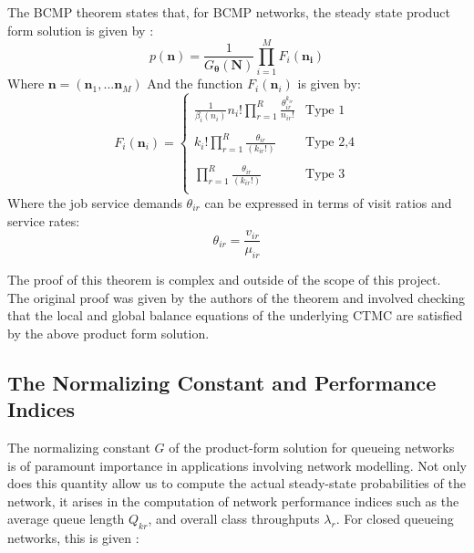 \begin{theorem}
    The BCMP theorem states that, for BCMP networks, the steady state product form solution is given by :
    \begin{equation} \label{eq:BCMP_PFQN}
        p(\mathbf{n}) = \frac{1}{G_{\boldsymbol{\theta}}(\mathbf{N})} \prod _ {i=1} ^ M F_i(\mathbf{n_i})
    \end{equation}
    Where \(\mathbf{n} = (\mathbf{n}_1, ... \mathbf{n}_M)\) And the function \(F_i(\mathbf{n}_i)\) is given by:
    \begin{equation}
        F_i(\mathbf{n}_i)=
        \begin{cases}
            \frac{1}{\beta_i(n_i)} n_i! \prod _{r=1} ^ R  \frac{\theta_{ir}^{k_{ir}}}{n_{ir}!} & \text{Type 1}\\\\
            k_i! \prod _{r=1} ^ R  \frac{\theta_{ir}}{(k_{ir}!)} & \text{Type 2,4}\\\\
            \prod _{r=1} ^ R \frac{\theta_{ir}}{(k_{ir}!)} & \text{Type 3}\\
        \end{cases}
    \end{equation}
    Where the job service demands \(\theta_{ir}\) can be expressed in terms of visit ratios and service rates:
    \begin{equation*}
        \theta_{ir} = \frac{v_{ir}}{\mu_{ir}}
    \end{equation*}
\end{theorem}

The proof of this theorem is complex and outside of the scope of this project. The original proof \cite{Baskett1975OpenCustomers} was given by the authors of the theorem and involved checking that the local and global balance equations of the underlying CTMC are satisfied by the above product form solution.

\subsection{The Normalizing Constant and Performance Indices}
The normalizing constant \(G\) of the product-form solution for queueing networks is of paramount importance in applications involving network modelling. Not only does this quantity allow us to compute the actual steady-state probabilities of the network, it arises in the computation of network performance indices such as the average queue length \(Q_{kr}\), and overall class throughputs \(\lambda_r\). For closed queueing networks, this is given \cite{Reiser1975QueuingAlgorithms}:

